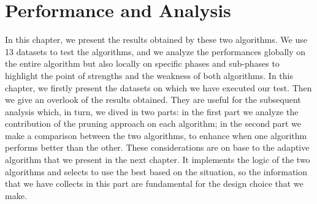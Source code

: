 \section{Performance and Analysis}\label{C6}
In this chapter, we present the results obtained by these two algorithms. We use 13 datasets to test the algorithms, and we analyze the performances globally on the entire algorithm but also locally on specific phases and sub-phases to highlight the point of strengths and the weakness of both algorithms. In this chapter, we firstly present the datasets on which we have executed our test. Then we give an overlook of the results obtained. They are useful for the subsequent analysis which, in turn, we dived in two parts: in the first part we analyze the contribution of the pruning approach on each algorithm; in the second part we make a comparison between the two algorithms, to enhance when one algorithm performs better than the other. These considerations are on base to the adaptive algorithm that we present in the next chapter. It implements the logic of the two algorithms and selects to use the best based on the situation, so the information that we have collects in this part are fundamental for the design choice that we make. 

